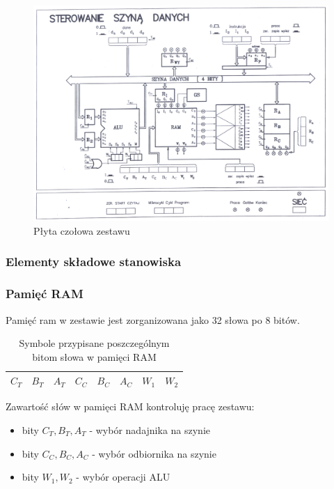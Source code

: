 \documentclass[../main.tex]{subfiles}
\begin{document}
        \begin{figure}[H]
            \centering
            \includegraphics[width=\linewidth]{szyna_schemat.png}
            \caption{Płyta czołowa zestawu}
            \label{fig:szyna_schemat}
        \end{figure}

    \subsubsection{Elementy składowe stanowiska}

        \subsubsection*{Pamięć RAM}

        Pamięć ram w zestawie jest zorganizowana jako 32 słowa po 8 bitów.
        \begin{table}[ht]
            \centering
            \begin{tabular}{|ccc|ccc|cc|}
                \hline
                $C_T$ & $B_T$ & $A_T$ & $C_C$ & $B_C$ & $A_C$ & $W_1$ & $W_2$ \\ \hline
            \end{tabular}
            \caption{Symbole przypisane  poszczególnym bitom słowa w pamięci RAM}
            \label{tab:ram_symbol}
        \end{table}
        
        Zawartość słów w pamięci RAM kontroluję pracę zestawu:

        \begin{itemize}
            \item bity $C_T, B_T, A_T$ - wybór nadajnika na szynie
            \item bity $C_C, B_C, A_C$ - wybór odbiornika na szynie
            \item bity $W_1, W_2$ - wybór operacji ALU
        \end{itemize}
\end{document}
